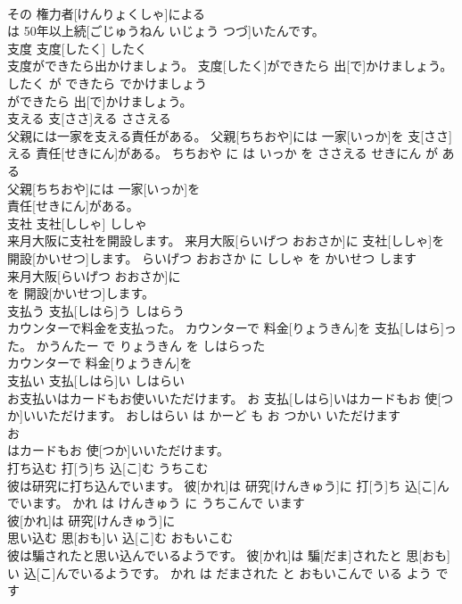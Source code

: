 \documentclass[8pt]{extreport}
\begin{document}
\begin{CJK}{UTF8}{min}
\\	その 権力者[けんりょくしゃ]による
\\	は 50年以上続[ごじゅうねん いじょう つづ]いたんです。			
\\	支度	支度[したく]	したく	
\\	支度ができたら出かけましょう。	支度[したく]ができたら 出[で]かけましょう。	したく が できたら でかけましょう	
\\	ができたら 出[で]かけましょう。			
\\	支える	支[ささ]える	ささえる	
\\	父親には一家を支える責任がある。	父親[ちちおや]には 一家[いっか]を 支[ささ]える 責任[せきにん]がある。	ちちおや に は いっか を ささえる せきにん が ある	
\\	父親[ちちおや]には 一家[いっか]を
\\	責任[せきにん]がある。			
\\	支社	支社[ししゃ]	ししゃ	
\\	来月大阪に支社を開設します。	来月大阪[らいげつ おおさか]に 支社[ししゃ]を 開設[かいせつ]します。	らいげつ おおさか に ししゃ を かいせつ します	
\\	来月大阪[らいげつ おおさか]に
\\	を 開設[かいせつ]します。			
\\	支払う	支払[しはら]う	しはらう	
\\	カウンターで料金を支払った。	カウンターで 料金[りょうきん]を 支払[しはら]った。	かうんたー で りょうきん を しはらった	
\\	カウンターで 料金[りょうきん]を
\\	支払い	支払[しはら]い	しはらい	
\\	お支払いはカードもお使いいただけます。	お 支払[しはら]いはカードもお 使[つか]いいただけます。	おしはらい は かーど も お つかい いただけます	
\\	お
\\	はカードもお 使[つか]いいただけます。			
\\	打ち込む	打[う]ち 込[こ]む	うちこむ	
\\	彼は研究に打ち込んでいます。	彼[かれ]は 研究[けんきゅう]に 打[う]ち 込[こ]んでいます。	かれ は けんきゅう に うちこんで います	
\\	彼[かれ]は 研究[けんきゅう]に
\\	思い込む	思[おも]い 込[こ]む	おもいこむ	
\\	彼は騙されたと思い込んでいるようです。	彼[かれ]は 騙[だま]されたと 思[おも]い 込[こ]んでいるようです。	かれ は だまされた と おもいこんで いる よう です	

\end{CJK}
\end{document}
